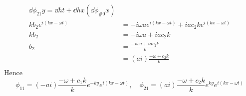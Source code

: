 \documentclass{/home/janmebows/Documents/LatexTemplates/myassignment}
\begin{document}
\begin{enumerate}
\begin{enumerate}
        \begin{align*}
            \dd{\phi_{21}}y = \dd ht + \dd hx\left(\dd{\phi_{\#0}}x\right)\\
            kb_{2} e^{i(kx-\omega t)}  &= -i\omega a e^{i(kx-\omega t)} + iac_{2}ke^{i(kx-\omega t)}\\
            kb_{2} &= -i\omega a + iac_{2} k \\
            b_{2} &= \frac{-i\omega a + iac_{2} k}{k}\\
            &= (ai) \frac{-\omega + c_{2}k }{k}\\
        \end{align*}
        Hence
        \[\phi_{11} = (-ai)\frac{-\omega  + c_{1} k}{k}e^{-ky} e^{i(kx-\omega t)},\quad \phi_{21} = (ai)\frac{-\omega  + c_{2} k}{k}e^{ky} e^{i(kx-\omega t)}\]
                





\end{enumerate}
\end{enumerate}
\end{document}

